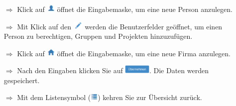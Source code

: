 \documentclass{article}
\begin{document}
\begin{multicols}{2}

\begin{tcolorbox}[colback=blue!5,colframe=blue!40!black,title=Personen und Firmen anlegen]
\begin{itemize}
  \item[$\Longrightarrow$] Klick auf \includegraphics[height=12pt]{Icons/Person.jpg} öffnet die Eingabemaske, um eine neue Person anzulegen.
	\item[$\Longrightarrow$] Mit Klick auf den \includegraphics[height=12pt]{Icons/Stift.jpg} werden die Benutzerfelder geöffnet, um einen Person zu berechtigen, Gruppen und Projekten hinzuzufügen.
  \item[$\Longrightarrow$] Klick auf \includegraphics[height=12pt]{Icons/Haus.jpg} öffnet die Eingabemaske, um eine neue Firma anzulegen.
  \item[$\Longrightarrow$] Nach den Eingaben klicken Sie auf \includegraphics[height=12pt]{Icons/B_Uebernehmen.jpg}. Die Daten werden gespeichert.
  \item[$\Longrightarrow$] Mit dem Listensymbol (\includegraphics[height=10pt]{Icons/Listensymbol_zurueck.jpg}) kehren Sie zur Übersicht zurück.

\end{itemize}
\end{tcolorbox}



\end{multicols}
\end{document}
